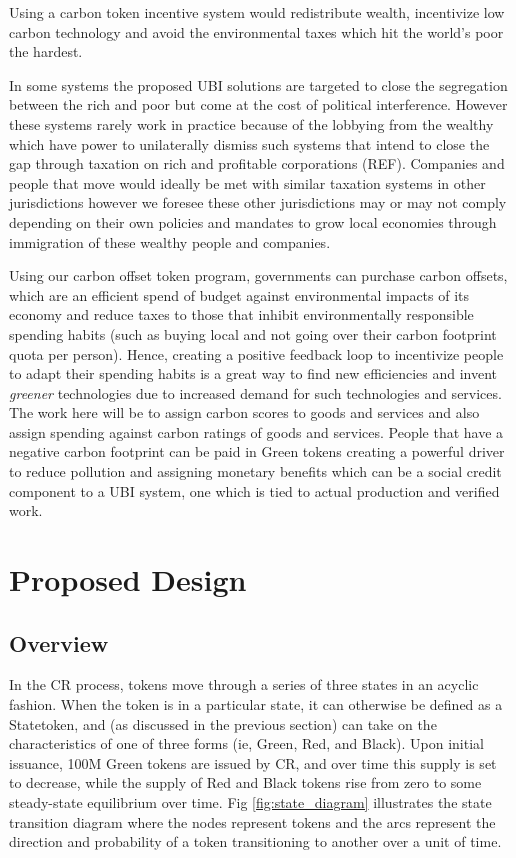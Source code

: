 \documentclass{article}
\begin{document}
Using a carbon token incentive system would redistribute wealth, incentivize low carbon
technology and avoid the environmental taxes which hit the world’s poor the hardest.

In some systems the proposed UBI solutions are targeted to close the segregation between the rich and poor but come at the cost of political interference. However these systems rarely work in practice because of the lobbying from the wealthy which have power to unilaterally dismiss such systems that intend to close the gap through taxation on rich and profitable corporations (REF). Companies and people that move would ideally be met with similar taxation systems in other jurisdictions however we foresee these other jurisdictions may or may not comply depending on their own policies and mandates to grow local economies through immigration of these wealthy people and companies.

Using our carbon offset token program, governments can purchase carbon offsets, which are an efficient spend of budget against environmental impacts of its economy and reduce taxes to those that inhibit environmentally responsible spending habits (such as buying local and not going over their carbon footprint quota per person). Hence, creating a positive feedback loop to incentivize people to adapt their spending habits is a great way to find new efficiencies and invent \emph{greener} technologies due to increased demand for such technologies and services. The work here will be to assign carbon scores to goods and services and also assign spending against carbon ratings of goods and services. People that have a negative carbon footprint can be paid in Green tokens creating a powerful driver to reduce pollution and assigning monetary benefits which can be a social credit component to a UBI system, one which is tied to actual production and verified work.

\section{Proposed Design}

\subsection{Overview}

In the CR process, tokens move through a series of three states in an acyclic fashion. When the token is in a particular state, it can otherwise be defined as a Statetoken, and (as discussed in the previous section) can take on the characteristics of one of three forms (ie, Green, Red, and Black). Upon initial issuance, 100M Green tokens are issued by CR, and over time this supply is set to decrease, while the supply of Red and Black tokens rise from zero to some steady-state equilibrium over time. Fig \ref{fig:state_diagram} illustrates the state transition diagram where the nodes represent tokens and the arcs represent the direction and probability of a token transitioning to another over a unit of time.
\end{document}
